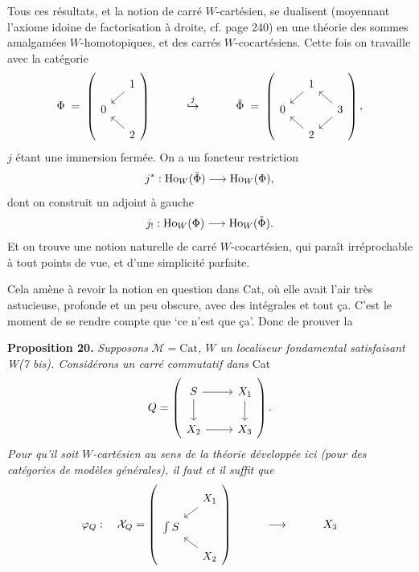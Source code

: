 Tous ces résultats, et la notion de carré $W$-cartésien, se dualisent (moyennant l'axiome idoine de factorisation à droite, cf. page 240) en une théorie des sommes amalgamées $W$-homotopiques, et des carrés $W$-cocartésiens. Cette fois on travaille avec la catégorie
\[
\Phi \;=\; \left(
\begin{tikzcd}[ampersand replacement=\&, row sep=small, column sep=small]
 \& 1 \arrow[dl] \\
0 \& \\
 \& 2 \arrow[ul]
\end{tikzcd}
\right)
\qquad\quad \overset{j}{\hookrightarrow} \qquad\quad
\tilde{\Phi} \;=\; \left(
\begin{tikzcd}[ampersand replacement=\&, row sep=small, column sep=small]
 \& 1 \arrow[dl] \& \\
0 \& \& 3 \arrow[ul] \arrow[dl] \\
 \& 2 \arrow[ul] \&
\end{tikzcd}
\right),
\]
$j$ étant une immersion fermée. On a un foncteur restriction
\[
j^* : \mathrm{Ho}_W(\tilde{\Phi}) \longrightarrow \mathrm{Ho}_W(\Phi),
\]
dont on construit un adjoint à gauche
\[
j_! : \mathrm{Ho}_W(\Phi) \longrightarrow \mathrm{Ho}_W(\tilde{\Phi}).
\]
Et on trouve une notion naturelle de
carré $W$-cocartésien, qui paraît irréprochable à tout points de vue, et d'une simplicité parfaite. %

Cela amène à revoir la notion en question dans Cat, où elle avait l'air très astucieuse, profonde et un peu obscure, avec des intégrales et tout ça. C'est le moment de se rendre compte que `ce n'est que ça'. Donc de prouver la

\textbf{Proposition 20.} \textit{Supposons} $\mathcal{M} = \mathrm{Cat}$\textit{, $W$ un localiseur fondamental satisfaisant W(7 bis). Considérons un carré commutatif dans} Cat
\[
Q = \left(
\begin{tikzcd}[ampersand replacement=\&]
S \arrow[r] \arrow[d] \& X_1 \arrow[d] \\
X_2 \arrow[r] \& X_3
\end{tikzcd}
\right).
\]
\textit{Pour qu'il soit $W$-cartésien} \textit{au sens de la théorie développée ici (pour des catégories de modèles générales), il faut et il suffit que}
\[
\varphi_Q : \quad \mathcal{X}_Q = \left(
\begin{tikzcd}[ampersand replacement=\&, row sep=small, column sep=small]
 \& X_1 \arrow[dl] \\
\int S \& \\
 \& X_2 \arrow[ul]
\end{tikzcd}
\right) \qquad\quad \longrightarrow \qquad\quad X_3
\]

